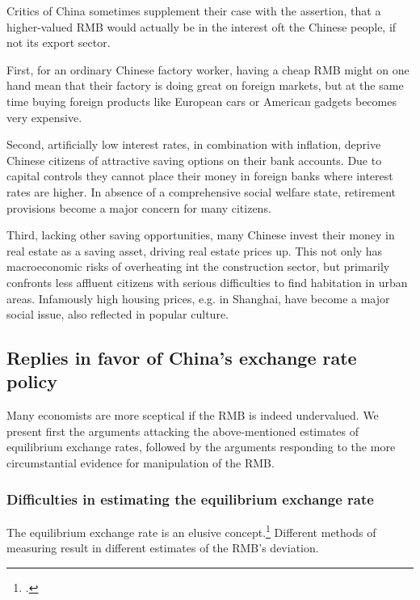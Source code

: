 \documentclass[11pt]{article}
\begin{document}
Critics of China sometimes supplement their case with the assertion, that a higher-valued RMB would actually be in the interest oft the Chinese people, if not its export sector.

First, for an ordinary Chinese factory worker, having a cheap RMB might on one hand mean that their factory 
is doing great on foreign markets, but at the same time buying foreign 
products like European cars or American gadgets becomes very expensive. 

Second, artificially low interest rates, in combination with inflation, deprive Chinese citizens of attractive saving options on their bank accounts. Due to capital controls they cannot place their money in foreign banks where interest rates are higher. In absence of a comprehensive social welfare state, retirement provisions become a major concern for many citizens.

Third, lacking other saving opportunities, many Chinese invest their money in real estate as a saving asset, driving real estate prices up. This not only has macroeconomic risks of overheating int the construction sector, but primarily confronts less affluent citizens with serious difficulties to find habitation in urban areas. Infamously high housing prices, e.g. in Shanghai, have become a major social issue, also reflected in popular culture. %



\subsection{Replies in favor of China's exchange rate policy}

Many economists are more sceptical if the RMB is indeed undervalued. We present first the arguments attacking the above-mentioned estimates of equilibrium exchange rates, followed by the arguments responding to the more circumstantial evidence for manipulation of the RMB.

\subsubsection{Difficulties in estimating the equilibrium exchange rate}

The equilibrium exchange rate is an elusive concept.\footnote{\cite[p. 16]{Yu2010}.} Different methods of measuring result in different estimates of the RMB's deviation. 
\end{document}
